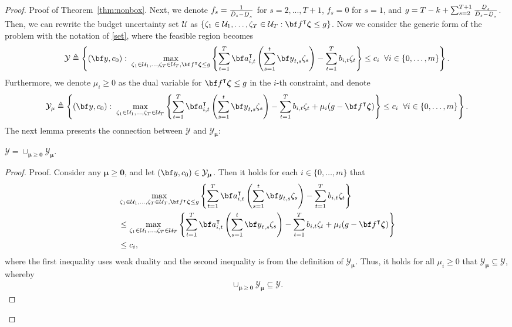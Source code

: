 \documentclass[nonblindrev,mnsc]{informs3} %
\newcommand{\ba}{{\bf a}}
\newcommand{\bff}{{\bf f}}
\newcommand{\by}{{\bf y}}
\newcommand{\bmu}{{\boldsymbol{\mu}}}
\newcommand{\bzeta}{{\boldsymbol{\zeta}}}
\newcommand{\bzero}{{\boldsymbol{0}}}
\newcommand{\ubar}[1]{\text{\b{$#1$}}}
\begin{document}
\begin{APPENDICES}
\begin{proof}{Proof of Theorem~\ref{thm:nonbox}.}
Next, we denote $f_s=\frac{1}{\bar{D}_s-\ubar{D}_s}$ for $s=2,...,T+1$, $f_s=0$ for $s=1$,  and $g=T-k+ \sum_{s=2}^{T+1} \frac{ \ubar{D}_s}{\bar{D}_s - \ubar{D}_s}$. Then, we can rewrite the budget uncertainty set $\mathcal{U}$ as  $\{\zeta_1 \in \mathcal{U}_1, \ldots,\zeta_T \in \mathcal{U}_T: \bff^\intercal \bzeta \le g\}$. Now we consider the generic form of the problem with the notation of \eqref{set}, where the feasible region becomes
\begin{align*}
\mathcal{Y} \triangleq \left \{ (\by,c_0): \;  \max_{\zeta_1 \in \mathcal{U}_1, \ldots,\zeta_T \in \mathcal{U}_T, \bff^\intercal\bzeta\le g}  \left \{ \sum_{t=1}^T \ba_{i,t}^\intercal  \left(\sum_{s=1}^t \by_{t,s} \zeta_s \right) - \sum_{t=1}^T b_{i,t}   \zeta_t \right \}  \le c_i  \;\; \forall i \in \{0,\ldots,m\} \right \}.
\end{align*}
Furthermore, we denote $\mu_i\ge 0$ as the dual variable for $\bff^\intercal \bzeta \le g$ in the $i$-th constraint, and denote
\begin{align*}%
\mathcal{Y}_{\mu} \triangleq \left \{ (\by,c_0): \;  \max_{\zeta_1 \in \mathcal{U}_1, \ldots,\zeta_T \in \mathcal{U}_T}  \left \{ \sum_{t=1}^T \ba_{i,t}^\intercal  \left(\sum_{s=1}^t \by_{t,s} \zeta_s \right) - \sum_{t=1}^T b_{i,t}   \zeta_t + \mu_i (g-\bff^\intercal \bzeta) \right \}  \le c_i  \;\; \forall i \in \{0,\ldots,m\} \right \}.
\end{align*}
The next lemma presents the connection between $\mathcal{Y}$ and $\mathcal{Y}_{\bmu}$:
\begin{lemma}\label{lem:equi}
$\mathcal{Y}=\cup_{\bmu\ge \bzero} \mathcal{Y}_{\bmu}$.
\end{lemma}

\begin{proof}{Proof.}
Consider any $\bmu\ge \bzero$, and let $(\by,c_0)\in \mathcal{Y}_{\bmu}$. Then it holds for each $i \in \{0,\ldots,m\}$ that
\begin{align*}
&\max_{\zeta_1 \in \mathcal{U}_1, \ldots,\zeta_T \in \mathcal{U}_T, \bff^\intercal\bzeta\le g}  \left \{ \sum_{t=1}^T \ba_{i,t}^\intercal  \left(\sum_{s=1}^t \by_{t,s} \zeta_s \right) - \sum_{t=1}^T b_{i,t}   \zeta_t \right \}\\
&\le \max_{\zeta_1 \in \mathcal{U}_1, \ldots,\zeta_T \in \mathcal{U}_T}  \left \{  \sum_{t=1}^T \ba_{i,t}^\intercal  \left(\sum_{s=1}^t \by_{t,s} \zeta_s \right) - \sum_{t=1}^T b_{i,t}   \zeta_t + \mu_i (g-\bff^\intercal\bzeta) \right \}\\
&\le c_i,
\end{align*}
where the first inequality uses weak duality and the second inequality is from the definition of $\mathcal{Y}_{\bmu}$. Thus, it holds for all $\mu_i\ge 0$ that $\mathcal{Y}_{\bmu}\subseteq \mathcal{Y}$, whereby
\begin{align}\label{eq:equi_1}
    \cup_{\bmu\ge \bzero}\mathcal{Y}_{\bmu}\subseteq \mathcal{Y}.
\end{align}



\end{proof}
\end{proof}
\end{APPENDICES}
\end{document}
